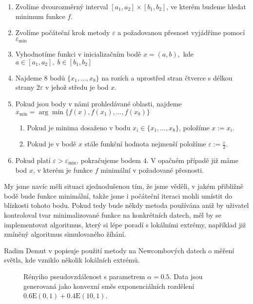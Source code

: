 \begin{enumerate}
	\item Zvolíme dvourozměrný interval $[a_1,a_2]\times [b_1,b_2]$, ve kterém budeme hledat minimum funkce $f$.
	\item Zvolíme počáteční krok metody $\varepsilon$ a požadovanou přesnost vyjádříme pomocí $\varepsilon_{\min}$
	\item Vyhodnotíme funkci v inicializačním bodě $x = (a,b),$ kde $a \in [a_1,a_2],\; b \in [b_1,b_2]$	
	\item Najdeme 8 bodů $\lbrace x_1,\ldots,x_8 \rbrace$ na rozích a uprostřed stran čtverce s délkou strany $2\varepsilon$ v jehož středu je bod $x$.	
	\item Pokud jsou body v námi prohledávané oblasti, najdeme $x_{\min} = \arg\min \lbrace f(x),f(x_1),\ldots,f(x_8)\rbrace$
		\begin{enumerate}
			\item Pokud je minima dosaženo v bodu $x_i \in \lbrace x_1,\ldots,x_8 \rbrace$, položíme $x := x_i$.
			\item Pokud je v bodě $x$ stále funkční hodnota nejmenší položíme $\varepsilon:= \frac{\varepsilon}{2}$.
		\end{enumerate}		
	\item Pokud platí $\varepsilon > \varepsilon_{\min}$, pokračujeme bodem 4. V opačném případě již máme bod $x$, v kterém je funkce $f$ minimální v požadované přesnosti.
\end{enumerate}

My jsme navíc měli situaci zjednodušenou tím, že jsme věděli, v jakém přibližně bodě bude funkce minimální, takže jsme i počáteční iteraci mohli umístit do blízkosti tohoto bodu. Pokud tedy bude někdy metoda používána aniž by uživatel kontroloval tvar minimalizované funkce na konkrétních datech, měl by se implementovat algoritmus, který si lépe poradí s lokálními extrémy, například již zmíněný algoritmus simulovaného žíhání.

Radim Demut v \cite{Demut2010} popisuje použití metody na Newcombových datech o měření světla, kde vzniklo několik lokálních extrémů.

\begin{figure}[htb!]
	\begin{center}
		\caption{Rényiho pseudovzdálenost s parametrem $\alpha = 0.5$. Data jsou generovaná jako konvexní směs exponenciálních rozdělení $0.6\mathrm{E}(0,1) + 0.4\mathrm{E}(10,1)$.}
		\label{fig-distanceE}
	\end{center}
\end{figure}

